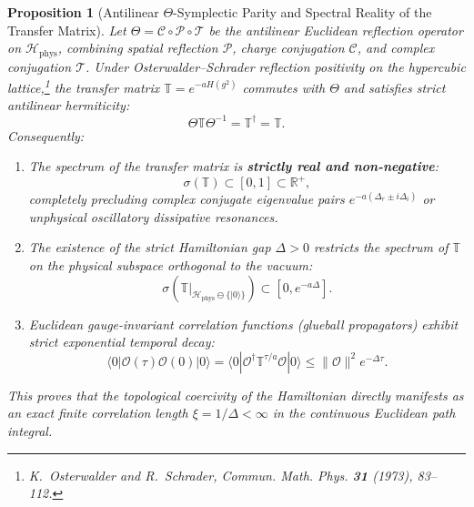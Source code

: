 \documentclass[11pt,reqno]{article}
\newtheorem{proposition}[theorem]{Proposition}
\begin{document}
\begin{proposition}[Antilinear $\Theta$-Symplectic Parity and Spectral Reality of the Transfer Matrix]
\label{prop:transfer_matrix}
Let $\Theta = \mathcal{C} \circ \mathcal{P} \circ \mathcal{T}$ be the antilinear Euclidean reflection operator on $\mathcal{H}_{\mathrm{phys}}$, combining spatial reflection $\mathcal{P}$, charge conjugation $\mathcal{C}$, and complex conjugation $\mathcal{T}$.
Under Osterwalder--Schrader reflection positivity on the hypercubic lattice,\footnote{K.~Osterwalder and R.~Schrader, Commun. Math. Phys. \textbf{31} (1973), 83--112.} the transfer matrix $\mathbb{T} = e^{-a H(g^2)}$ commutes with $\Theta$ and satisfies strict antilinear hermiticity:
\begin{equation}
    \label{eq:theta_symplectic_hermiticity}
    \Theta \mathbb{T} \Theta^{-1} = \mathbb{T}^\dagger = \mathbb{T}.
\end{equation}
Consequently:
\begin{enumerate}
    \item The spectrum of the transfer matrix is \textbf{strictly real and non-negative}:
    \begin{equation}
        \label{eq:transfer_spectrum_real}
        \sigma(\mathbb{T}) \subset [0, 1] \subset \mathbb{R}^+,
    \end{equation}
    completely precluding complex conjugate eigenvalue pairs $e^{-a(\Delta_r \pm i \Delta_i)}$ or unphysical oscillatory dissipative resonances.
    \item The existence of the strict Hamiltonian gap $\Delta > 0$ restricts the spectrum of $\mathbb{T}$ on the physical subspace orthogonal to the vacuum:
    \begin{equation}
        \label{eq:transfer_spectrum}
        \sigma\left(\mathbb{T}|_{\mathcal{H}_{\mathrm{phys}} \ominus \{|0\rangle\}}\right) \subset [0, e^{-a \Delta}].
    \end{equation}
    \item Euclidean gauge-invariant correlation functions (glueball propagators) exhibit strict exponential temporal decay:
    \begin{equation}
        \label{eq:exponential_decay_wightman}
        \langle 0 | \mathcal{O}(\tau) \mathcal{O}(0) | 0 \rangle = \langle 0 | \mathcal{O}^\dagger \mathbb{T}^{\tau/a} \mathcal{O} | 0 \rangle \le \|\mathcal{O}\|^2 e^{-\Delta \tau}.
    \end{equation}
\end{enumerate}
This proves that the topological coercivity of the Hamiltonian directly manifests as an exact finite correlation length $\xi = 1/\Delta < \infty$ in the continuous Euclidean path integral.

\end{proposition}
\end{document}
